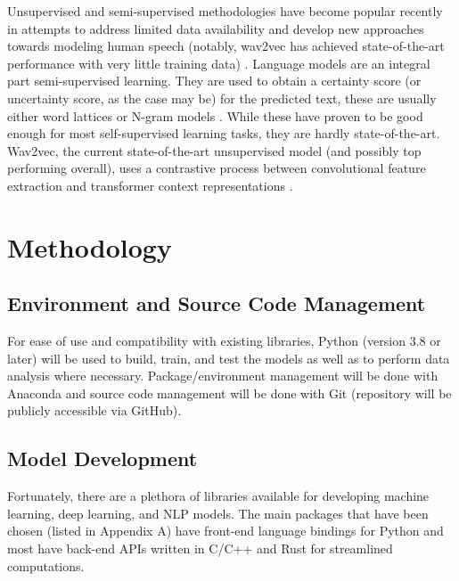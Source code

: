 \documentclass[10pt]{article}
\begin{document}
        Unsupervised and semi-supervised methodologies have become popular recently in attempts to address limited data availability
        and develop new approaches towards modeling human speech (notably, wav2vec has achieved state-of-the-art performance with
        very little training data)
        \cite{baevski_wav2vec_2020,badrinath_automatic_2022,srinivasamurthy_semi-supervised_2017,zuluaga-gomez_contextual_2021}.
        Language models are an integral part semi-supervised learning. They are used to obtain a certainty score (or uncertainty
        score, as the case may be) for the predicted text, these are usually either word lattices or N-gram models
        \cite{badrinath_automatic_2022,srinivasamurthy_semi-supervised_2017,zuluaga-gomez_contextual_2021}.
        While these have proven to be good enough for most self-supervised learning tasks, they are hardly state-of-the-art.
        Wav2vec, the current state-of-the-art unsupervised model (and possibly top performing overall), uses a contrastive process
        between convolutional feature extraction and transformer context representations \cite{baevski_wav2vec_2020}.




    \section{Methodology}
        \subsection{Environment and Source Code Management}
            For ease of use and compatibility with existing libraries, Python (version 3.8 or later)
            will be used to build, train, and test the models as well as to perform data analysis
            where necessary.
            Package/environment management will be done with Anaconda and source code management
            will be done with Git (repository will be publicly accessible via GitHub).

        \subsection{Model Development}
            Fortunately, there are a plethora of libraries available for developing machine learning,
            deep learning, and NLP models.
            The main packages that have been chosen (listed in Appendix A) have front-end language
            bindings for Python and most have back-end APIs written in C/C++ and Rust for streamlined computations.
\end{document}
